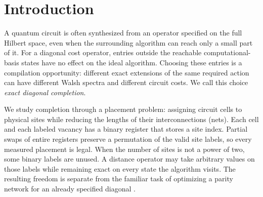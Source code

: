 \documentclass[manuscript,screen,review]{acmart}
\begin{document}
\maketitle

\section{Introduction}
A quantum circuit is often synthesized from an operator specified on the full
Hilbert space, even when the surrounding algorithm can reach only a small
part of it. For a diagonal cost operator, entries outside the reachable
computational-basis states have no effect on the ideal algorithm. Choosing
these entries is a compilation opportunity: different exact extensions of
the same required action can have different Walsh spectra and different
circuit costs. We call this choice \emph{exact diagonal completion}.

We study completion through a placement problem: assigning circuit cells
to physical sites while reducing the lengths of their interconnections
(nets). Each cell and each labeled vacancy has a binary register that stores
a site index. Partial swaps of entire registers preserve a permutation of the valid site labels,
so every measured placement is legal. When the number of sites is not a
power of two, some binary labels are unused. A distance operator may take
arbitrary values on those labels while remaining exact on every state the
algorithm visits. The resulting freedom is separate from the familiar task
of optimizing a parity network for an already specified diagonal
\cite{welch2014diagonal,amy2018cnotphase,shende2005incomplete}.
\end{document}

